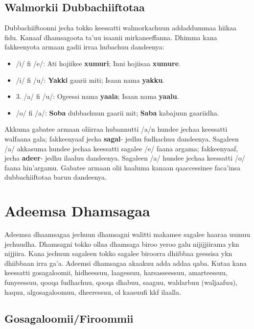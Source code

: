 \documentclass[11pt,b5paper]{book}
\begin{document}
\begin{itemize}
\subsection{Walmorkii Dubbachiiftotaa}

Dubbachiiftoonni jecha tokko keessatti walmorkachuun addaddummaa hiikaa fidu. Kanaaf dhamsagoota ta’uu isaanii
mirkaneeffanna. Dhimma kana fakkeenyota armaan gadii irraa hubachuu dandeenya: 
\begin{itemize}
	\item /i/ fi /e/: Ati hojiikee \textbf{xumuri}; Inni hojiisaa \textbf{xumure}.
	\item /i/ fi /u/: \textbf{Yakki} gaarii miti; Isaan nama \textbf{yakku}.
	\item 3. /a/ fi /u/: Ogeessi nama \textbf{yaala}; Isaan nama \textbf{yaalu}.
	\item /o/ fi /a/: \textbf{Soba} dubbachuun gaarii mit; \textbf{Saba} kabajuun gaariidha.
\end{itemize}











Akkuma gabatee armaan oliirraa hubannutti /a/n hundee jechaa keessatti walfaana gala; fakkeenyaaf jecha \textbf{sagal}- jedhu fudhachuu dandeenya. Sagaleen /a/ akkasuma hundee jechaa keessatti sagalee /e/ faana argama; fakkeenyaaf, jecha \textbf{adeer}- jedhu ilaaluu dandeenya. Sagaleen /a/ hundee jechaa keessatti /o/ faana hin'argamu. Gabatee armaan olii haaluma kanaan qaaccessinee faca'insa dubbachiiftotaa baruu dandeenya.

\section{Adeemsa Dhamsagaa}

Adeemsa dhaamsagaa jechuun dhamsagni walitti makamee  sagalee haaraa uumuu jechuudha. Dhamsagni tokko ollaa  dhamsaga biroo yeroo galu nijijjiirama ykn nijjiira. Kana  jechuun sagaleen tokko sagalee biroorra dhiibbaa geessisa ykn  dhiibbaan irra ga'a. Adeemsi dhamsagaa akaakuu adda addaa  qaba. Kutaa kana keessatti gosagaloomii, hidheessuu, laagessuu, harsasseessuu, amarteessuu, funyeessuu, qooqa  fudhachuu, qooqa dhabuu, saaguu, waldarbuu (waljaafuu),  haquu, algosagaloomuu, dheeressuu, ol kaasuufi kkf ilaalla. 

\subsection{Gosagaloomii/Firoommii} 
\setlength{\parindent}{3em}


\end{itemize}
\end{document}
